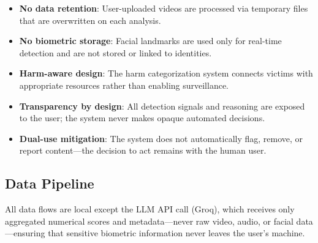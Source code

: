 \documentclass[11pt,a4paper]{article}
\begin{document}
\begin{itemize}[leftmargin=2em]
    \item \textbf{No data retention}: User-uploaded videos are processed via temporary files that are overwritten on each analysis.
    \item \textbf{No biometric storage}: Facial landmarks are used only for real-time detection and are not stored or linked to identities.
    \item \textbf{Harm-aware design}: The harm categorization system connects victims with appropriate resources rather than enabling surveillance.
    \item \textbf{Transparency by design}: All detection signals and reasoning are exposed to the user; the system never makes opaque automated decisions.
    \item \textbf{Dual-use mitigation}: The system does not automatically flag, remove, or report content---the decision to act remains with the human user.
\end{itemize}

\subsection{Data Pipeline}

All data flows are local except the LLM API call (Groq), which receives only aggregated numerical scores and metadata---never raw video, audio, or facial data---ensuring that sensitive biometric information never leaves the user's machine.
\end{document}
